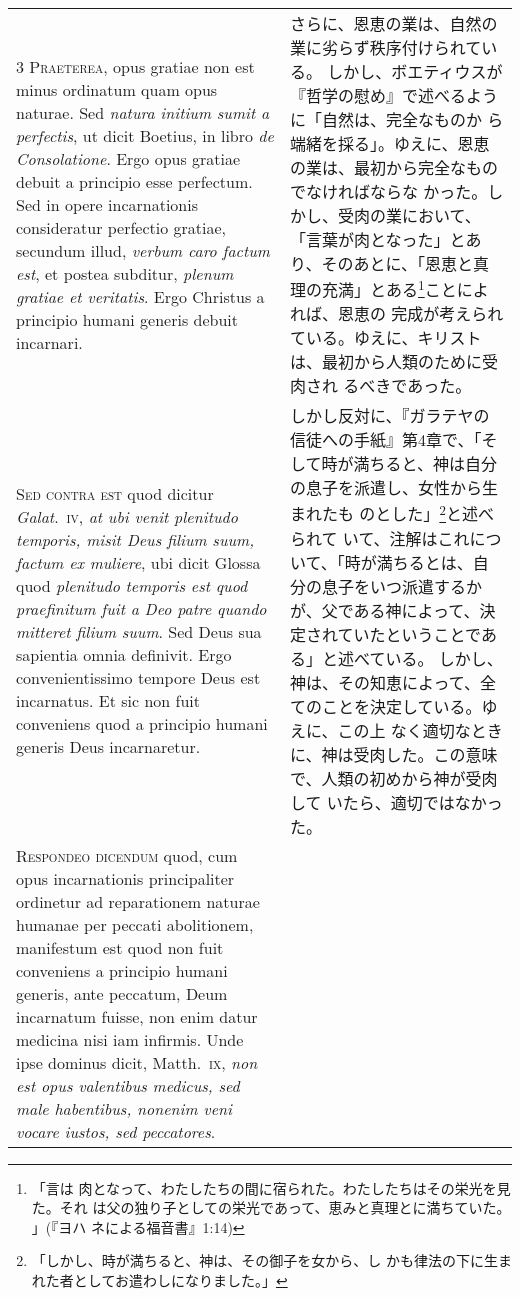 \documentclass[10pt]{jsarticle} %
\begin{document}
\begin{longtable}{p{21em}p{21em}}
\\


3 {\scshape Praeterea}, opus gratiae non est minus
ordinatum quam opus naturae. Sed {\itshape natura initium sumit a perfectis}, ut
dicit Boetius, in libro {\itshape de Consolatione}. Ergo opus gratiae debuit a
principio esse perfectum. Sed in opere incarnationis consideratur
perfectio gratiae, secundum illud, {\itshape verbum caro factum est}, et postea
subditur, {\itshape plenum gratiae et veritatis}. Ergo Christus a principio humani
generis debuit incarnari.


&

さらに、恩恵の業は、自然の業に劣らず秩序付けられている。
しかし、ボエティウスが『哲学の慰め』で述べるように「自然は、完全なものか
 ら端緒を採る」。ゆえに、恩恵の業は、最初から完全なものでなければならな
 かった。しかし、受肉の業において、「言葉が肉となった」とあり、そのあとに、「恩恵と真理の充満」とある\footnote{「言は
 肉となって、わたしたちの間に宿られた。わたしたちはその栄光を見た。それ
 は父の独り子としての栄光であって、恵みと真理とに満ちていた。 」(『ヨハ
 ネによる福音書』1:14)}ことによれば、恩恵の
 完成が考えられている。ゆえに、キリストは、最初から人類のために受肉され
 るべきであった。


\\


{\scshape Sed contra est} quod dicitur {\itshape Galat}.~{\scshape iv}, {\itshape at
ubi venit plenitudo temporis, misit Deus filium suum, factum ex muliere},
ubi dicit Glossa quod {\itshape plenitudo temporis est quod praefinitum fuit a Deo
patre quando mitteret filium suum}. Sed Deus sua sapientia omnia
definivit. Ergo convenientissimo tempore Deus est incarnatus. Et sic non
fuit conveniens quod a principio humani generis Deus incarnaretur.


&

しかし反対に、『ガラテヤの信徒への手紙』第4章で、「そして時が満ちると、神は自分の息子を派遣し、女性から生まれたも
 のとした」\footnote{「しかし、時が満ちると、神は、その御子を女から、し
 かも律法の下に生まれた者としてお遣わしになりました。」 }と述べられて
 いて、注解はこれについて、「時が満ちるとは、自分の息子をいつ派遣するか
 が、父である神によって、決定されていたということである」と述べている。
しかし、神は、その知恵によって、全てのことを決定している。ゆえに、この上
 なく適切なときに、神は受肉した。この意味で、人類の初めから神が受肉して
 いたら、適切ではなかった。


\\


{\scshape Respondeo dicendum} quod, cum opus
incarnationis principaliter ordinetur ad reparationem naturae humanae
per peccati abolitionem, manifestum est quod non fuit conveniens a
principio humani generis, ante peccatum, Deum incarnatum fuisse, non
enim datur medicina nisi iam infirmis. Unde ipse dominus dicit,
Matth.~{\scshape ix}, {\itshape non est opus valentibus medicus, sed male habentibus, nonenim veni vocare iustos, sed peccatores}. 



\end{longtable}
\end{document}
